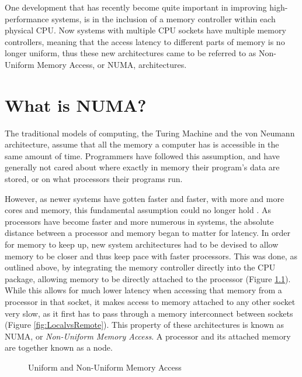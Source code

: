One development that has recently become quite important in improving high-performance systems, 
is in the inclusion of a memory controller within each physical CPU\cite{lameter_numa_2013}.
Now systems with multiple CPU sockets have multiple memory controllers, 
meaning that the access latency to different parts of memory is no longer uniform,
thus these new architectures came to be referred to as Non-Uniform Memory Access, or NUMA, architectures.

\chapter{What is NUMA?}
\label{whatisnuma}
The traditional models of computing, the Turing Machine and the von Neumann architecture, 
assume that all the memory a computer has is accessible in the same amount of time. 
Programmers have followed this assumption, and have generally not cared about where exactly in memory their program's data are stored,
or on what processors their programs run.

However, as newer systems have gotten faster and faster, with more and more cores and memory, this fundamental assumption could no longer hold
\cite{lameter_numa_2013}.
As processors have become faster and more numerous in systems, the absolute distance between a processor and memory began to matter for latency.
In order for memory to keep up, new system architectures had to be devised to allow memory to be closer and thus keep pace with faster processors.
This was done, as outlined above, by integrating the memory controller directly into the CPU package, 
allowing memory to be directly attached to the processor (Figure \ref{fig:UMAvsNUMA}).
While this allows for much lower latency when accessing that memory from a processor in that socket, 
it makes access to memory attached to any other socket very slow, as it first has to pass through a memory interconnect between sockets (Figure \ref{fig:LocalvsRemote}).
This property of these architectures is known as NUMA, or \textit{Non-Uniform Memory Access}.
A processor and its attached memory are together known as a node.

\begin{figure}[H]
    \centering
    \resizebox{!}{0.25\textheight}{}
    \resizebox{!}{0.25\textheight}{}
    \captionsetup{width=0.8\linewidth}
    \caption{Uniform and Non-Uniform Memory Access}
    \label{fig:UMAvsNUMA}
\end{figure}

